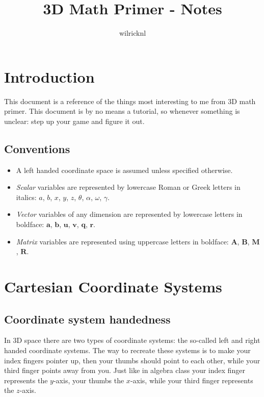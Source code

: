 \documentclass[11pt]{article}
\author{wilricknl}
\title{3D Math Primer - Notes}
\begin{document}
\maketitle

\newpage
\tableofcontents

\newpage
\section{Introduction}

This document is a reference of the things most interesting to me from 3D math primer. This document is by no means a tutorial, so whenever something is unclear: step up your game and figure it out.

\subsection{Conventions}

\begin{itemize}
\item A left handed coordinate space is assumed unless specified otherwise.
\item \textit{Scalar} variables are represented by lowercase Roman or Greek letters in italics: $a$, $b$, $x$, $y$, $z$, $\theta$,
  $\alpha$, $\omega$, $\gamma$.
\item
  \textit{Vector} variables of any dimension are represented by lowercase
  letters in boldface: $\mathbf{a}$, $\mathbf{b}$, $\mathbf{u}$, $\mathbf{v}$, $\mathbf{q}$, $\mathbf{r}$.
\item \textit{Matrix} variables are represented using uppercase letters in
  boldface: $\mathbf{A}$, $\mathbf{B}$, $\mathbf{M}$, $\mathbf{R}$.
\end{itemize}

\section{Cartesian Coordinate Systems}

\subsection{Coordinate system handedness}

In 3D space there are two types of coordinate systems: the so-called left and right handed coordinate systems. The way to recreate these systems is to make your index fingers pointer up, then your thumbs should point to each other, while your third finger points away from you. Just like in algebra class your index finger represents the $y$-axis, your thumbs the $x$-axis, while your third finger represents the $z$-axis.
\end{document}
